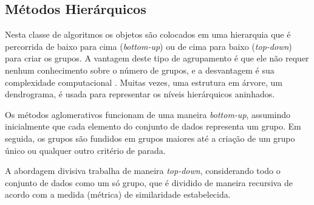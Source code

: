 \begin{figure}[!ht]
	\centering
\end{figure}
\begin{figure}[!ht]
	\centering
\end{figure}

\subsection{Métodos Hierárquicos}
Nesta classe de algoritmos os objetos são colocados em uma hierarquia que é percorrida de baixo para cima (\textit{bottom-up}) ou de cima para baixo (\textit{top-down}) para criar os grupos. A vantagem deste tipo de agrupamento é que ele não requer nenhum conhecimento sobre o número de grupos, e a desvantagem é sua complexidade computacional \cite{Lin2004}. Muitas vezes, uma estrutura em árvore, um dendrograma, é usada para representar os níveis hierárquicos aninhados.

Os métodos aglomerativos funcionam de uma maneira \textit{bottom-up},
assumindo inicialmente que cada elemento do conjunto de dados representa um grupo. Em seguida, os grupos são fundidos em grupos maiores até a criação de um grupo único ou qualquer outro critério de parada.

A abordagem divisiva trabalha de maneira \textit{top-down}, considerando todo o conjunto de dados como um só grupo, que é dividido de maneira recursiva de acordo com a medida (métrica) de similaridade estabelecida.

